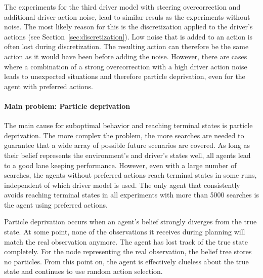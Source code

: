 The experiments for the third driver model with steering overcorrection and additional driver action noise, lead to similar resuls as the experiments without noise. The most likely reason for this is the discretization applied to the driver's actions (see Section~\ref{sec:discretization}). Low noise that is added to an action is often lost during discretization. The resulting action can therefore be the same action as it would have been before adding the noise. However, there are cases where a combination of a strong overcorrection with a high driver action noise leads to unexpected situations and therefore particle deprivation, even for the agent with preferred actions.



\paragraph{Main problem: Particle deprivation}

The main cause for suboptimal behavior and reaching terminal states is particle deprivation. The more complex the problem, the more searches are needed to guarantee that a wide array of possible future scenarios are covered. As long as their belief represents the environment's and driver's states well, all agents lead to a good lane keeping performance. However, even with a large number of searches, the agents without preferred actions reach terminal states in some runs, independent of which driver model is used. The only agent that consistently avoids reaching terminal states in all experiments with more than 5000 searches is the agent using preferred actions. 

Particle deprivation occurs when an agent's belief strongly diverges from the true state. At some point, none of the observations it receives during planning will match the real observation anymore. The agent has lost track of the true state completely. For the node representing the real observation, the belief tree stores no particles. From this point on, the agent is effectively clueless about the true state and continues to use random action selection.

